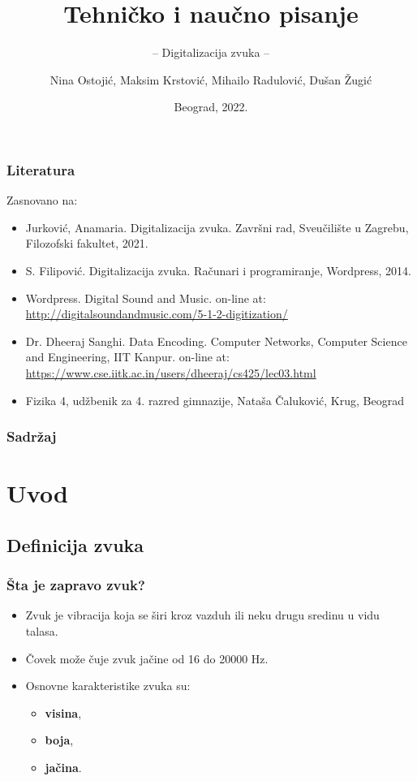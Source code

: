 \documentclass{beamer}
\title{Tehničko i naučno pisanje}
\subtitle{-- Digitalizacija zvuka --}
\author{Nina Ostojić, Maksim Krstović, Mihailo Radulović, Dušan Žugić}
\institute{Matematički fakultet\\Univerzitet u Beogradu}
\date{
	\footnotesize{Beograd, 2022.}	
}
\begin{document}
\begin{frame}
	\thispagestyle{empty}
	\titlepage
\end{frame}

\addtocounter{framenumber}{-1}

\begin{frame}[fragile]\frametitle{Literatura}
	Zasnovano na:
	\begin{itemize}
		\item Jurković, Anamaria. Digitalizacija zvuka. Završni rad, Sveučilište u Zagrebu, Filozofski fakultet, 2021.
		\item S. Filipović. Digitalizacija zvuka. Računari i programiranje, Wordpress, 2014.
		\item Wordpress. Digital Sound and Music. on-line at: \url{http://digitalsoundandmusic.com/5-1-2-digitization/}
		\item Dr. Dheeraj Sanghi. Data Encoding. Computer Networks, Computer Science and Engineering, IIT Kanpur. on-line at: \url{https://www.cse.iitk.ac.in/users/dheeraj/cs425/lec03.html}
		\item Fizika 4, udžbenik za 4. razred gimnazije, Nataša Čaluković, Krug, Beograd
	\end{itemize}
\end{frame}

\begin{frame}
	\frametitle{Sadržaj} 
	\tableofcontents[hidesubsections] 
\end{frame}

\section{Uvod}
\subsection{Definicija zvuka}
\begin{frame}[fragile]\frametitle{Šta je zapravo zvuk?}
	\begin{itemize}	
 
		\item Zvuk je vibracija koja se širi kroz vazduh ili neku drugu sredinu u vidu talasa.
        \item Čovek može čuje zvuk jačine od 16 do 20000 Hz.
		\item Osnovne karakteristike zvuka su: 
		\begin{itemize}
			\item \textbf{visina}, 
			\item \textbf{boja}, 
			\item \textbf{jačina}.
		\end{itemize}
	\end{itemize}
\end{frame}
\end{document}
